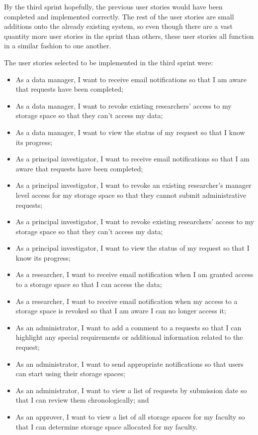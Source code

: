 \documentclass[a4paper,titlepage,12pt]{article}
\begin{document}
By the third sprint hopefully, the previous user stories would have been
completed and implemented correctly. The rest of the user stories are small
additions onto the already existing system, so even though there are a vast
quantity more user stories in the sprint than others, these user stories all
function in a similar fashion to one another.

The user stories selected to be implemented in the third sprint were:

\begin{itemize}
	\item As a data manager, I want to receive email notifications so that
	      I am aware that requests have been completed;
	\item As a data manager, I want to revoke existing researchers' access
	      to my storage space so that they can't access my data;
	\item As a data manager, I want to view the status of my request so
	      that I know its progress;
	\item As a principal investigator, I want to receive email
	      notifications so that I am aware that requests have been
	      completed;
	\item As a principal investigator, I want to revoke an existing
	      researcher's manager level access for my storage space so that
	      they cannot submit administrative requests;
	\item As a principal investigator, I want to revoke existing
	      researchers' access to my storage space so that they can't access
	      my data;
	\item As a principal investigator, I want to view the status of my
	      request so that I know its progress;
	\item As a researcher, I want to receive email notification when I am
	      granted access to a storage space so that I can access the data;
	\item As a researcher, I want to receive email notification when my
	      access to a storage space is revoked so that I am aware I can no
	      longer access it;
	\item As an administrator, I want to add a comment to a requests so
	      that I can highlight any special requirements or additional
	      information related to the request;
	\item As an administrator, I want to send appropriate notifications so
	      that users can start using their storage spaces;
	\item As an administrator, I want to view a list of requests by
	      submission date so that I can review them chronologically; and
	\item As an approver, I want to view a list of all storage spaces for
	      my faculty so that I can determine storage space allocated for my
	      faculty.
\end{itemize}
\end{document}
